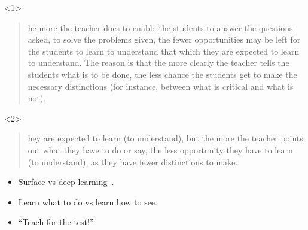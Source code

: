 \begin{frame}
  \begin{definition}
  \end{definition}

  \begin{onlyenv}<1>
    \begin{example}
      \blockcquote[p.~13]{NecessaryConditionsOfLearning}{%
        he more the teacher does to enable the students to answer 
        the questions asked, to solve the problems given, the fewer 
        opportunities may be left for the students to learn to understand that 
        which they are expected to learn to understand. The reason is that the 
        more clearly the teacher tells the students what is to be done, the 
        less chance the students get to make the necessary distinctions (for 
        instance, between what is critical and what is not).%
      }
    \end{example}
  \end{onlyenv}

  \begin{onlyenv}<2>
    \begin{example}
      \blockcquote[p.~13]{NecessaryConditionsOfLearning}{%
        hey are expected to learn (to understand), but the more the 
        teacher points out what they have to do or say, the less opportunity 
        they have to learn (to understand), as they have fewer distinctions to 
        make.%
      }
    \end{example}
  \end{onlyenv}
\end{frame}

\begin{frame}
  \begin{remark}
    \begin{itemize}
      \item Surface vs deep learning~\cite{DeepSurfaceLearning}.
      \item Learn what to do vs learn how to see.
      \item \enquote{Teach for the test!}
    \end{itemize}
  \end{remark}
\end{frame}

